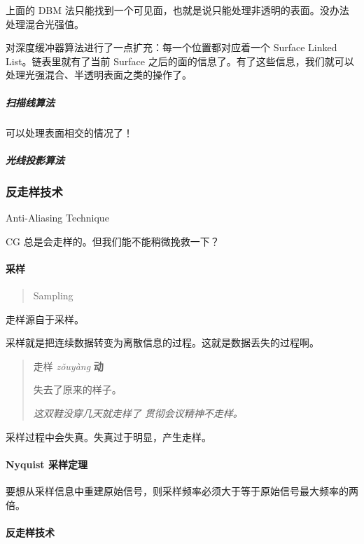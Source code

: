 \documentclass[
]{article}
\begin{document}
上面的 DBM
法只能找到一个可见面，也就是说只能处理非透明的表面。没办法处理混合光强值。

对深度缓冲器算法进行了一点扩充：每一个位置都对应着一个 Surface Linked
List。链表里就有了当前 Surface
之后的面的信息了。有了这些信息，我们就可以处理光强混合、半透明表面之类的操作了。

\hypertarget{header-n121}{%
\subparagraph{扫描线算法}\label{header-n121}}

可以处理表面相交的情况了！

\hypertarget{header-n123}{%
\subparagraph{光线投影算法}\label{header-n123}}

\hypertarget{header-n124}{%
\subsubsection{反走样技术}\label{header-n124}}

Anti-Aliasing Technique

CG 总是会走样的。但我们能不能稍微挽救一下？

\hypertarget{header-n127}{%
\paragraph{采样}\label{header-n127}}

\begin{quote}
Sampling
\end{quote}

走样源自于采样。

采样就是把连续数据转变为离散信息的过程。这就是数据丢失的过程啊。

\begin{quote}
走样 \emph{zǒuyàng} \textbf{动}

失去了原来的样子。

\emph{这双鞋没穿几天就走样了 \textbar{} 贯彻会议精神不走样。}
\end{quote}

采样过程中会失真。失真过于明显，产生走样。

\hypertarget{header-n137}{%
\paragraph{Nyquist 采样定理}\label{header-n137}}

要想从采样信息中重建原始信号，则采样频率必须大于等于原始信号最大频率的两倍。

\hypertarget{header-n139}{%
\paragraph{反走样技术}\label{header-n139}}
\end{document}
